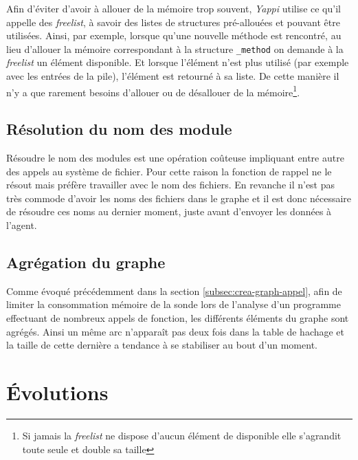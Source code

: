 \begin{note}[freelist]
Afin d'éviter d'avoir à allouer de la mémoire trop souvent, \emph{Yappi} utilise ce qu'il appelle des \emph{freelist}, à savoir des listes de structures pré-allouées et pouvant être utilisées. Ainsi, par exemple, lorsque qu'une nouvelle méthode est rencontré, au lieu d'allouer la mémoire correspondant à la structure \verb|_method| on demande à la \emph{freelist} un élément disponible. Et lorsque l'élément n'est plus utilisé (par exemple avec les entrées de la pile), l'élément est retourné à sa liste. De cette manière il n'y a que rarement besoins d'allouer ou de désallouer de la mémoire\footnote{Si jamais la \emph{freelist} ne dispose d'aucun élément de disponible elle s'agrandit toute seule et double sa taille}.
\end{note}

\subsection{Résolution du nom des module}
Résoudre le nom des modules est une opération coûteuse impliquant entre autre des appels au système de fichier. Pour cette raison la fonction de rappel ne le résout mais préfère travailler avec le nom des fichiers. En revanche il n'est pas très commode d'avoir les noms des fichiers dans le graphe et il est donc nécessaire de résoudre ces noms au dernier moment, juste avant d'envoyer les données à l'agent.

\subsection{Agrégation du graphe}
Comme évoqué précédemment dans la section \vref{subsec:crea-graph-appel}, afin de limiter la consommation mémoire de la sonde lors de l'analyse d'un programme effectuant de nombreux appels de fonction, les différents éléments du graphe sont agrégés. Ainsi un même arc n’apparaît pas deux fois dans la table de hachage et la taille de cette dernière a tendance à se stabiliser au bout d'un moment.

  \section{Évolutions}
  	
